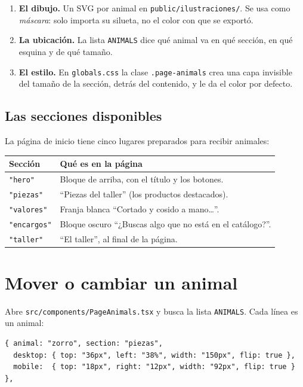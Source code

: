 \documentclass[11pt,a4paper]{article}
\newcommand{\code}[1]{\texttt{\small #1}}
\begin{document}
\begin{enumerate}
  \item \textbf{El dibujo.} Un SVG por animal en \code{public/ilustraciones/}. Se usa como \emph{máscara}: solo importa su silueta, no el color con que se exportó.
  \item \textbf{La ubicación.} La lista \code{ANIMALS} dice qué animal va en qué sección, en qué esquina y de qué tamaño.
  \item \textbf{El estilo.} En \code{globals.css} la clase \code{.page-animals} crea una capa invisible del tamaño de la sección, detrás del contenido, y le da el color por defecto.
\end{enumerate}

\subsection{Las secciones disponibles}

La página de inicio tiene cinco lugares preparados para recibir animales:

\begin{center}
\renewcommand{\arraystretch}{1.25}
\begin{tabularx}{0.92\textwidth}{@{}l X@{}}
\toprule
\textbf{Sección} & \textbf{Qué es en la página} \\
\midrule
\code{"hero"}     & Bloque de arriba, con el título y los botones. \\
\code{"piezas"}   & ``Piezas del taller'' (los productos destacados). \\
\code{"valores"}  & Franja blanca ``Cortado y cosido a mano…''. \\
\code{"encargos"} & Bloque oscuro ``¿Buscas algo que no está en el catálogo?''. \\
\code{"taller"}   & ``El taller'', al final de la página. \\
\bottomrule
\end{tabularx}
\end{center}

\section{Mover o cambiar un animal}

Abre \code{src/components/PageAnimals.tsx} y busca la lista \code{ANIMALS}. Cada línea es un animal:

\begin{lstlisting}
{ animal: "zorro", section: "piezas",
  desktop: { top: "36px", left: "38%", width: "150px", flip: true },
  mobile:  { top: "18px", right: "12px", width: "92px", flip: true } },
\end{lstlisting}
\end{document}
